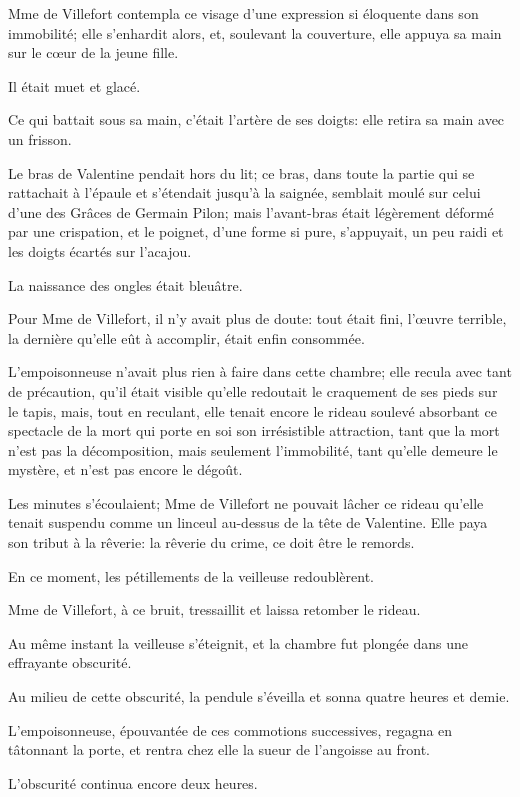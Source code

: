 Mme de Villefort contempla ce visage d'une expression si éloquente dans son immobilité; elle s'enhardit alors, et, soulevant la couverture, elle appuya sa main sur le cœur de la jeune fille. 

Il était muet et glacé. 

Ce qui battait sous sa main, c'était l'artère de ses doigts: elle retira sa main avec un frisson. 

Le bras de Valentine pendait hors du lit; ce bras, dans toute la partie qui se rattachait à l'épaule et s'étendait jusqu'à la saignée, semblait moulé sur celui d'une des Grâces de Germain Pilon; mais l'avant-bras était légèrement déformé par une crispation, et le poignet, d'une forme si pure, s'appuyait, un peu raidi et les doigts écartés sur l'acajou. 

La naissance des ongles était bleuâtre. 

Pour Mme de Villefort, il n'y avait plus de doute: tout était fini, l'œuvre terrible, la dernière qu'elle eût à accomplir, était enfin consommée. 

L'empoisonneuse n'avait plus rien à faire dans cette chambre; elle recula avec tant de précaution, qu'il était visible qu'elle redoutait le craquement de ses pieds sur le tapis, mais, tout en reculant, elle tenait encore le rideau soulevé absorbant ce spectacle de la mort qui porte en soi son irrésistible attraction, tant que la mort n'est pas la décomposition, mais seulement l'immobilité, tant qu'elle demeure le mystère, et n'est pas encore le dégoût. 

Les minutes s'écoulaient; Mme de Villefort ne pouvait lâcher ce rideau qu'elle tenait suspendu comme un linceul au-dessus de la tête de Valentine. Elle paya son tribut à la rêverie: la rêverie du crime, ce doit être le remords. 

En ce moment, les pétillements de la veilleuse redoublèrent. 

Mme de Villefort, à ce bruit, tressaillit et laissa retomber le rideau. 

Au même instant la veilleuse s'éteignit, et la chambre fut plongée dans une effrayante obscurité. 

Au milieu de cette obscurité, la pendule s'éveilla et sonna quatre heures et demie. 

L'empoisonneuse, épouvantée de ces commotions successives, regagna en tâtonnant la porte, et rentra chez elle la sueur de l'angoisse au front. 

L'obscurité continua encore deux heures. 

